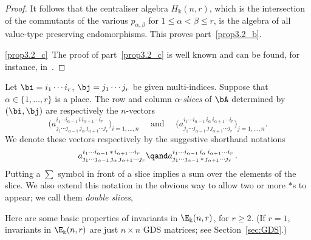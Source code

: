 \begin{proof}
It follows that the centraliser algebra $H_\Bbbk(n,r)$, which is the
intersection of the commutants of the various $p_{\alpha,\beta}$ for
$1 \le \alpha < \beta \le r$, is the algebra of all value-type
preserving endomorphisms. This proves part~\ref{prop3.2_b}.

\ref{prop3.2_c}~The proof of part~\ref{prop3.2_c} is well known and can be found, for instance, in~\cite{Green:book}.
\end{proof}




\begin{defi}\label{def:slices}
Let $\bi = i_1 \cdots i_r$, $\bj = j_1 \cdots j_r$ be given
multi-indices. Suppose that $\alpha \in \{1, \dots, r\}$ is a
place. The row and column $\alpha$-\emph{slices} of $\bA$ determined
by $(\bi,\bj)$ are respectively the $n$-vectors
 \[
 \big( a^{i_1\cdots i_{\alpha-1} \,i\, i_{\alpha+1}\cdots
 i_r}_{j_1\cdots j_{\alpha-1} \, j_\alpha\, j_{\alpha+1}\cdots
 j_r}\big)_{i = 1, \dots, n} \quad \text{ and } \quad \big(
 a^{i_1\cdots i_{\alpha-1} \,i_\alpha\, i_{\alpha+1}\cdots
 i_r}_{j_1\cdots j_{\alpha-1} \,j\, j_{\alpha+1}\cdots j_r}
 \big)_{j = 1, \dots, n} .
 \]
We denote these vectors respectively by the suggestive shorthand
notations
 \[
 a^{i_1\cdots i_{\alpha-1} \,*\, i_{\alpha+1}\cdots i_r}_{j_1\cdots
 j_{\alpha-1} \, j_\alpha\, j_{\alpha+1}\cdots j_r} \qand a^{i_1\cdots
 i_{\alpha-1} \,i_\alpha\, i_{\alpha+1}\cdots i_r}_{j_1\cdots
 j_{\alpha-1} \,*\, j_{\alpha+1}\cdots j_r} \, .
 \]
Putting a $\sum$ symbol in front of a slice implies a sum over
the elements of the slice. We also extend this notation in the
obvious way to allow two or more $*$s to appear; we call them
\emph{double slices}, \etc
\end{defi}

Here are some basic properties of invariants in $\E_\Bbbk(n,r)$, for
$r \ge 2$. (If $r=1$, invariants in $\E_\Bbbk(n,r)$ are just $n
\times n$ GDS matrices; see Section~\ref{sec:GDS}.)


